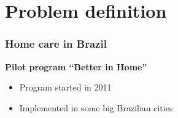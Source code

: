 \section{Problem definition}

\begin{frame}[plain]
   \sectionpage
\end{frame}

\begin{frame}
   \frametitle{Home care in Brazil}

   \textbf{Pilot program ``Better in Home''}
   \begin{itemize}
      \item Program started in 2011
      \item Implemented in some big Brazilian cities
   \end{itemize}


\end{frame}

